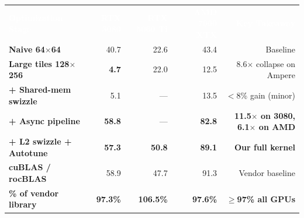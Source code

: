 \documentclass[border=12pt]{standalone}
\begin{document}
\begin{tabular}{
  >{\bfseries}l
  r r r
  r
}

\rowcolor{hdrblue}
\textcolor{white}{\textbf{Optimization Stage}} &
\textcolor{white}{\textbf{RTX 3080}} &
\textcolor{white}{\textbf{RTX 5060 Ti}} &
\textcolor{white}{\textbf{AMD 7900 XTX}} &
\textcolor{white}{\textbf{Key Takeaway}} \\

\rowcolor{rowgray}
\normalfont Naive 64$\times$64            & 40.7 & 22.6 & 43.4  & Baseline \\

\rowcolor{rowred}
\normalfont Large tiles 128$\times$256    &  \textbf{4.7} & 22.0 & 12.5  & 8.6$\times$ collapse on Ampere \\

\rowcolor{rowgray}
\normalfont\quad + Shared-mem swizzle     &  5.1 & --- & 13.5  & $<$8\% gain (minor) \\

\rowcolor{rowgreen}
\normalfont\quad\quad + Async pipeline    & \textbf{58.8} & --- & \textbf{82.8}  & \textbf{11.5$\times$ on 3080, 6.1$\times$ on AMD} \\

\rowcolor{deepgreen}
\normalfont\quad\quad\quad + L2 swizzle + Autotune & \textbf{57.3} & \textbf{50.8} & \textbf{89.1}  & \textbf{Our full kernel} \\

\midrule
\rowcolor{rowgold}
\normalfont cuBLAS / rocBLAS              & 58.9 & 47.7 & 91.3  & Vendor baseline \\

\rowcolor{deepgreen}
\normalfont \textbf{\% of vendor library} & \textbf{97.3\%} & \textbf{106.5\%} & \textbf{97.6\%} & \textbf{$\geq$97\% all GPUs} \\

\end{tabular}
\end{document}

